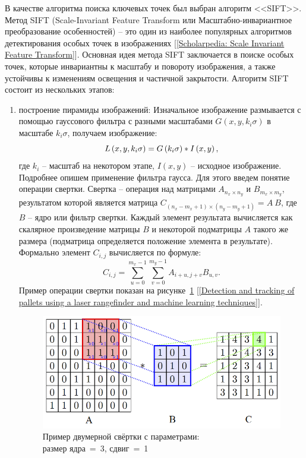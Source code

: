 \documentclass[14pt, a4paper]{extreport}
\begin{document}
	В качестве алгоритма поиска ключевых точек был выбран алгоритм <<SIFT>>. Метод SIFT (Scale-Invariant Feature Transform или Масштабно-\linebreak инвариантное преобразование особенностей) -- это один из наиболее популярных алгоритмов детектирования особых точек в изображениях [\ref{Scholarpedia: Scale Invariant Feature Transform}]. Основная идея метода SIFT заключается в поиске особых точек, которые инвариантны к масштабу и повороту изображения, а также устойчивы к изменениям освещения и частичной закрытости. Алгоритм SIFT состоит из нескольких этапов:
	\begin{enumerate}[label={\arabic*)}]
		\item построение пирамиды изображений: Изначальное изображение размывается с помощью гауссового фильтра с разными масштабами $G\left(x,y,k_i\sigma \right)$ в масштабе $k_i\sigma$, получаем изображение: 
		\vspace*{-0.2cm}
		\begin{equation*}
			L\left(x,y,k_i\sigma \right)=G\left(k_i\sigma \right)*I\left(x,y\right), 
			\label{L(x,y,sigma)}
			\vspace*{-0.4cm}
		\end{equation*}
		где $k_i$ -- масштаб на некотором этапе, $I\left(x,y\right)$ -- исходное изображение. 
		Подробнее опишем применение фильтра гаусса. Для этого введем понятие операции свертки. Свертка -- операция над матрицами $A_{n_x \times n_y}$ и $B_{m_x \times m_y}$, результатом которой является матрица $C_{(n_x - m_x + 1)\times(n_y - m_y + 1)}=A~B$, где $B$ -- ядро или фильтр свертки. Каждый элемент результата вычисляется как скалярное произведение матрицы $B$ и некоторой подматрицы $A$ такого же размера (подматрица определяется положение элемента в результате). Формально элемент $C_{i,j}$ вычисляется по формуле: 
		\begin{equation*}
			C_{i, j} = \sum_{u=0}^{m_x - 1} \sum_{v = 0}^{m_y - 1} A_{i+u, j+v}B_{u, v}. 
			\label{eq:Cij1}
		\end{equation*}
		Пример операции свертки показан на рисунке~\ref{fig:conv} [\ref{Detection and tracking of pallets using a laser rangefinder and machine learning techniques}].
		\begin{figure}[ht!]
			\centering
			\includegraphics[width=\textwidth]{image/chapter_2/conv-example.png}
			\caption{Пример двумерной свёртки с параметрами:\\ размер ядра~=~3, сдвиг~=~1}
			\label{fig:conv}
		\end{figure}
		

\end{enumerate}
\end{document}
